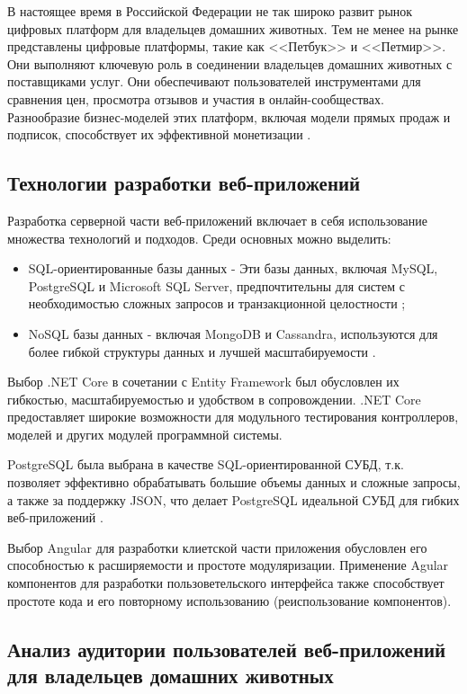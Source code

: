 В настоящее время в Российской Федерации не так широко развит рынок цифровых платформ для владельцев домашних животных. Тем не менее на рынке представлены цифровые платформы, такие как <<Петбук>> и <<Петмир>>. Они выполняют ключевую роль в соединении владельцев домашних животных с поставщиками услуг. Они обеспечивают пользователей инструментами для сравнения цен, просмотра отзывов и участия в онлайн-сообществах. Разнообразие бизнес-моделей этих платформ, включая модели прямых продаж и подписок, способствует их эффективной монетизации \cite{market}.

\subsection{Технологии разработки веб-приложений}

Разработка серверной части веб-приложений включает в себя использование множества технологий и подходов. Среди основных можно выделить:

\begin{itemize}
  \item SQL-ориентированные базы данных -\- Эти базы данных, включая MySQL, PostgreSQL и Microsoft SQL Server, предпочтительны для систем с необходимостью сложных запросов и транзакционной целостности \cite{freedman};
  \item NoSQL базы данных -\- включая MongoDB и Cassandra, используются для более гибкой структуры данных и лучшей масштабируемости \cite{market}.
\end{itemize}

Выбор .NET Core в сочетании с Entity Framework был обусловлен их гибкостью, масштабируемостью и удобством в сопровождении. .NET Core предоставляет широкие возможности для модульного тестирования контроллеров, моделей и других модулей программной системы.

PostgreSQL была выбрана в качестве SQL-ориентированной СУБД, т.к. позволяет эффективно обрабатывать большие объемы данных и сложные запросы, а также за поддержку JSON, что делает PostgreSQL идеальной СУБД для гибких веб-приложений \cite{freedman}.

Выбор Angular для разработки клиетской части приложения обусловлен его способностью к расширяемости и простоте модуляризации. Применение Agular компонентов для разработки пользоветельского интерфейса также способствует простоте кода и его повторному использованию (реиспользование компонентов).

\subsection{Анализ аудитории пользователей веб-приложений для владельцев домашних животных}

